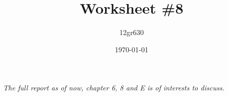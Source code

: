 \documentclass[a4paper,11pt,oneside,fleqn]{memoir}
\begin{document}
\author{12gr630}
\title{Worksheet \#8}
\date{\today}
\maketitle
\begin{center}
\textit{The full report as of now, chapter 6, 8 and E is of interests to discuss.}
\end{center}


%
%


\end{document}

